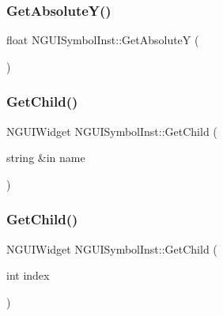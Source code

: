 \hypertarget{class_n_g_u_i_symbol_inst_aec00e28d203883db079ef1e57b87715f}{}\label{class_n_g_u_i_symbol_inst_aec00e28d203883db079ef1e57b87715f} 
\subsubsection{\texorpdfstring{Get\+Absolute\+Y()}{GetAbsoluteY()}}
{\footnotesize\ttfamily float N\+G\+U\+I\+Symbol\+Inst\+::\+Get\+AbsoluteY (\begin{DoxyParamCaption}{ }\end{DoxyParamCaption})}

\hypertarget{class_n_g_u_i_symbol_inst_a0e3dad8124c81f5049ea8d367a7dc0c3}{}\label{class_n_g_u_i_symbol_inst_a0e3dad8124c81f5049ea8d367a7dc0c3} 
\subsubsection{\texorpdfstring{Get\+Child()}{GetChild()}\hspace{0.1cm}{\footnotesize\ttfamily [1/2]}}
{\footnotesize\ttfamily N\+G\+U\+I\+Widget N\+G\+U\+I\+Symbol\+Inst\+::\+Get\+Child (\begin{DoxyParamCaption}\item[{string \&in}]{name }\end{DoxyParamCaption})}

\hypertarget{class_n_g_u_i_symbol_inst_af944fb359f1cf67c6e1d1d405a46e211}{}\label{class_n_g_u_i_symbol_inst_af944fb359f1cf67c6e1d1d405a46e211} 
\subsubsection{\texorpdfstring{Get\+Child()}{GetChild()}\hspace{0.1cm}{\footnotesize\ttfamily [2/2]}}
{\footnotesize\ttfamily N\+G\+U\+I\+Widget N\+G\+U\+I\+Symbol\+Inst\+::\+Get\+Child (\begin{DoxyParamCaption}\item[{int}]{index }\end{DoxyParamCaption})}

